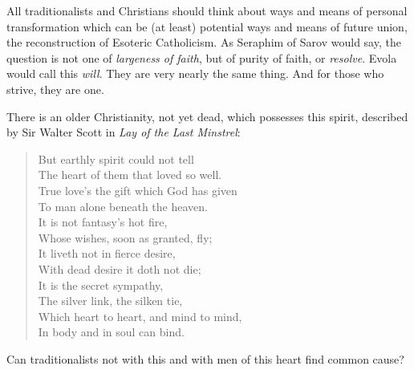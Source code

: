 All traditionalists and Christians should think about ways and means of personal transformation which can be (at least) potential ways and means of future union, the reconstruction of Esoteric Catholicism. As Seraphim of Sarov would say, the question is not one of \emph{largeness of faith}, but of purity of faith, or \emph{resolve}. Evola would call this \emph{will}. They are very nearly the same thing. And for those who strive, they are one.

There is an older Christianity, not yet dead, which possesses this spirit, described by Sir Walter Scott in \emph{Lay of the Last Minstrel}:

\begin{quotex}
\begin{verse}
But earthly spirit could not tell\\
The heart of them that loved so well.\\
True love's the gift which God has given\\
To man alone beneath the heaven.\\
It is not fantasy's hot fire,\\
Whose wishes, soon as granted, fly;\\
It liveth not in fierce desire,\\
With dead desire it doth not die;\\
It is the secret sympathy,\\
The silver link, the silken tie,\\
Which heart to heart, and mind to mind,\\
In body and in soul can bind.
\end{verse}
\end{quotex}


Can traditionalists not with this and with men of this heart find common cause?



